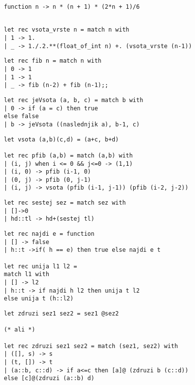 \begin{Odgovor}{5}
\begin{verbatim}
function n -> n * (n + 1) * (2*n + 1)/6
\end{verbatim}
\end{Odgovor}
\begin{Odgovor}{6}
\begin{verbatim}

let rec vsota_vrste n = match n with
| 1 -> 1.
| _ -> 1./.2.**(float_of_int n) +. (vsota_vrste (n-1))
\end{verbatim}
\end{Odgovor}
\begin{Odgovor}{7}
\begin{verbatim}
let rec fib n = match n with
| 0 -> 1
| 1 -> 1
| _ -> fib (n-2) + fib (n-1);;
\end{verbatim}
\end{Odgovor}
\begin{Odgovor}{8}
\begin{verbatim}
let rec jeVsota (a, b, c) = match b with
| 0 -> if (a = c) then true
else false
| b -> jeVsota ((naslednjik a), b-1, c)
\end{verbatim}
\end{Odgovor}
\begin{Odgovor}{9}
\begin{verbatim}
let vsota (a,b)(c,d) = (a+c, b+d)

let rec pfib (a,b) = match (a,b) with
| (i, j) when i <= 0 && j<=0 -> (1,1)
| (i, 0) -> pfib (i-1, 0)
| (0, j) -> pfib (0, j-1)
| (i, j) -> vsota (pfib (i-1, j-1)) (pfib (i-2, j-2))
\end{verbatim}
\end{Odgovor}
\begin{Odgovor}{11}
\begin{verbatim}
let rec sestej sez = match sez with
| []->0
| hd::tl -> hd+(sestej tl)
\end{verbatim}
\end{Odgovor}
\begin{Odgovor}{12}
\begin{verbatim}
let rec najdi e = function
| [] -> false
| h::t ->if( h == e) then true else najdi e t

let rec unija l1 l2 =
match l1 with
| [] -> l2
| h::t -> if najdi h l2 then unija t l2
else unija t (h::l2)
\end{verbatim}
\end{Odgovor}
\begin{Odgovor}{13}
\begin{verbatim}
let zdruzi sez1 sez2 = sez1 @sez2

(* ali *)

let rec zdruzi sez1 sez2 = match (sez1, sez2) with
| ([], s) -> s
| (t, []) -> t
| (a::b, c::d) -> if a<=c then [a]@ (zdruzi b (c::d))
else [c]@(zdruzi (a::b) d)
\end{verbatim}
\end{Odgovor}
